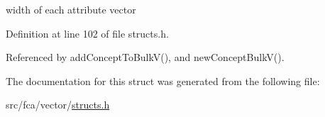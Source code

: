 width of each attribute vector 



\-Definition at line 102 of file structs.\-h.



\-Referenced by add\-Concept\-To\-Bulk\-V(), and new\-Concept\-Bulk\-V().



\-The documentation for this struct was generated from the following file\-:\begin{DoxyCompactItemize}
\item 
src/fca/vector/\hyperlink{vector_2structs_8h}{structs.\-h}\end{DoxyCompactItemize}

